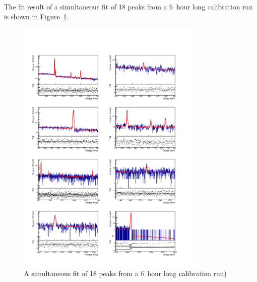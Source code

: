 \documentclass[/main.tex]{subfiles}
\begin{document}
The fit result of a simultaneous fit of 18 peaks from a 6~hour long  calibration run is shown in Figure~\ref{fig:simultaneousfit}.
\begin{figure}[p]
  \centering
  \includegraphics[width=0.8\textwidth]{fitResults}
  \caption[Simultaneous peak fit of  calibration]{\label{fig:simultaneousfit}
    A simultaneous fit of 18 peaks from a 6~hour long  calibration run)
  }
\end{figure}
\end{document}
